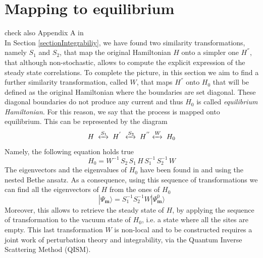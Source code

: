 \documentclass[10pt]{article}
\numberwithin{equation}{section}
\numberwithin{equation}{subsection}
\begin{document}
\section{Mapping to equilibrium} \label{Section-Mapping}
{\color{blue}check also Appendix A in
\cite{Alcaraz:1992zc} \cite{Sklyanin:1988yz}} \\
In Section \ref{sectionIntegrabiliy}, we have found two similarity transformations, namely $S_{1}$ and $S_{2}$, that map the original Hamiltonian $H$ onto a simpler one $H^{''}$, that although non-stochastic, allows to compute the explicit expression of the steady state correlations. To complete the picture, in this section we aim to find a further similarity transformation, called $W$, that maps $H^{''}$ onto $H_{0}$ that will be defined as the original Hamiltonian where the boundaries are set diagonal. These diagonal boundaries do not produce any current and thus $H_{0}$ is called \textit{equilibrium Hamiltonian}. For this reason, we say that the process is mapped onto equilibrium.
This can be represented by the diagram 
\begin{equation}
	H\;\xleftrightarrow{S_{1}}\;H^{'}\;\xleftrightarrow{S_{2}}\;H^{''}\xleftrightarrow{W}\;H_{0}
\end{equation} 
Namely, the following equation holds true
\begin{equation}
	H_{0}=W^{-1}\,S_{2}\,S_{1}\,H\,S_{1}^{-1}\,S_{2}^{-1}\,W
\end{equation}
The eigenvectors and the eigenvalues of $H_{0}$ have been found in \cite{belliard2} and \cite{belliard2011nested} using the nested Bethe ansatz. 
As a consequence, using this sequence of transformations we can find all the eigenvectors of $H$ from the ones of $H_{0}$
\begin{equation}
	|\Psi_{\bm{m}}\rangle=S_{1}^{-1}S_{2}^{-1}W|\Psi_{\bm{m}}^{0}\rangle
\end{equation}
Moreover, this allows to retrieve the steady state of $H$, by applying the sequence of transformation to the vacuum state of $H_{0}$, i.e. a state where all the sites are empty. This last transformation $W$ is non-local and to be constructed requires a joint work of perturbation theory and integrability, via the Quantum Inverse Scattering Method (QISM). 
\end{document}
